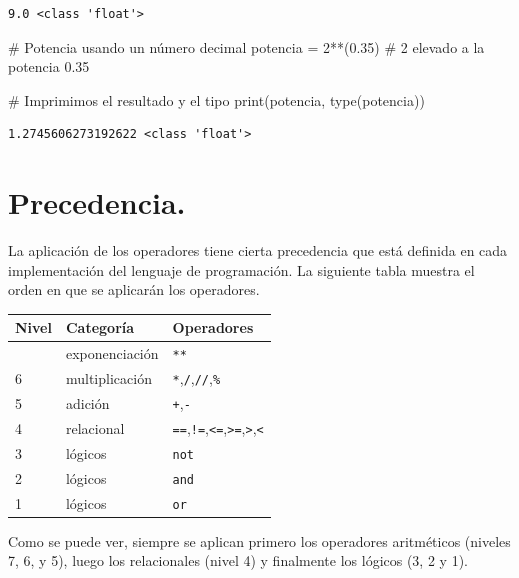 \documentclass[
  spanish,
  letterpaper,
]{scrbook}
\newenvironment{Shaded}{\begin{snugshade}}{\end{snugshade}}
\newcommand{\BuiltInTok}[1]{\textcolor[rgb]{0.00,0.23,0.31}{#1}}
\newcommand{\CommentTok}[1]{\textcolor[rgb]{0.37,0.37,0.37}{#1}}
\newcommand{\DecValTok}[1]{\textcolor[rgb]{0.68,0.00,0.00}{#1}}
\newcommand{\FloatTok}[1]{\textcolor[rgb]{0.68,0.00,0.00}{#1}}
\newcommand{\NormalTok}[1]{\textcolor[rgb]{0.00,0.23,0.31}{#1}}
\newcommand{\OperatorTok}[1]{\textcolor[rgb]{0.37,0.37,0.37}{#1}}
\theoremstyle{definition}
\theoremstyle{remark}
\begin{document}
\begin{verbatim}
9.0 <class 'float'>
\end{verbatim}

\begin{Shaded}
\begin{Highlighting}[]
\CommentTok{\# Potencia usando un número decimal}
\NormalTok{potencia }\OperatorTok{=} \DecValTok{2}\OperatorTok{**}\NormalTok{(}\FloatTok{0.35}\NormalTok{) }\CommentTok{\# 2 elevado a la potencia 0.35}

\CommentTok{\# Imprimimos el resultado y el tipo}
\BuiltInTok{print}\NormalTok{(potencia, }\BuiltInTok{type}\NormalTok{(potencia))}
\end{Highlighting}
\end{Shaded}

\begin{verbatim}
1.2745606273192622 <class 'float'>
\end{verbatim}

\section{Precedencia.}\label{sec-c-precedencia}

La aplicación de los operadores tiene cierta precedencia que está
definida en cada implementación del lenguaje de programación. La
siguiente tabla muestra el orden en que se aplicarán los operadores.

\begin{longtable}[]{@{}lll@{}}
\toprule\noalign{}
Nivel & Categoría & Operadores \\
\midrule\noalign{}
\endhead
\bottomrule\noalign{}
\endlastfoot
7 & exponenciación & \texttt{**} \\
6 & multiplicación & \texttt{*},\texttt{/},\texttt{//},\texttt{\%} \\
5 & adición & \texttt{+},\texttt{-} \\
4 & relacional &
\texttt{==},\texttt{!=},\texttt{\textless{}=},\texttt{\textgreater{}=},\texttt{\textgreater{}},\texttt{\textless{}} \\
3 & lógicos & \texttt{not} \\
2 & lógicos & \texttt{and} \\
1 & lógicos & \texttt{or} \\
\end{longtable}

Como se puede ver, siempre se aplican primero los operadores aritméticos
(niveles 7, 6, y 5), luego los relacionales (nivel 4) y finalmente los
lógicos (3, 2 y 1).
\end{document}
